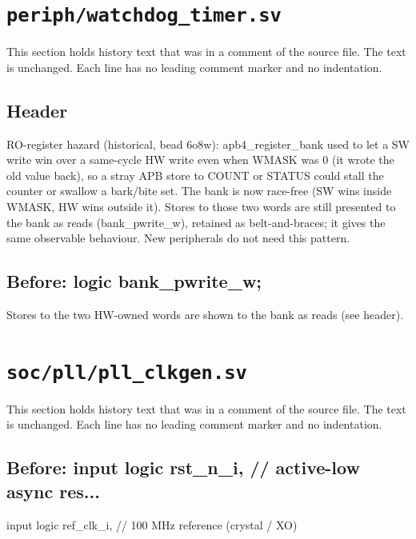 \section{\texttt{periph/watchdog\_timer.sv}}\label{cr:mod:watchdog-timer}

This section holds history text that was in a comment of the source file. The text is unchanged. Each line has no leading comment marker and no indentation.

\begin{record}

\subsection*{Header}

\begin{textblock}
RO-register hazard (historical, bead 6o8w): apb4_register_bank used to let a SW write win over a
same-cycle HW write even when WMASK was 0 (it wrote the old value back), so a stray APB store to
COUNT or STATUS could stall the counter or swallow a bark/bite set. The bank is now race-free
(SW wins inside WMASK, HW wins outside it). Stores to those two words are still presented to the
bank as reads (bank_pwrite_w), retained as belt-and-braces; it gives the same observable
behaviour. New peripherals do not need this pattern.
\end{textblock}

\subsection*{Before: logic bank\_pwrite\_w;}

\begin{textblock}
Stores to the two HW-owned words are shown to the bank as reads (see header).
\end{textblock}

\end{record}

\section{\texttt{soc/pll/pll\_clkgen.sv}}\label{cr:mod:pll-clkgen}

This section holds history text that was in a comment of the source file. The text is unchanged. Each line has no leading comment marker and no indentation.

\begin{record}

\subsection*{Before: input  logic       rst\_n\_i,      // active-low async res...}

\begin{textblock}
input  logic       ref_clk_i,    // 100 MHz reference (crystal / XO)
\end{textblock}

\end{record}

